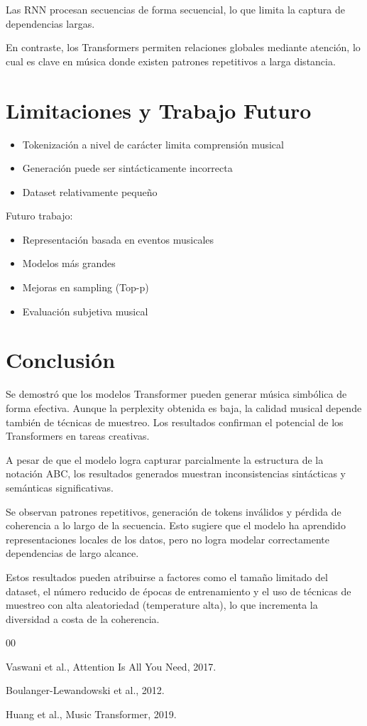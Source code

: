 \documentclass[conference]{IEEEtran}
\begin{document}
Las RNN procesan secuencias de forma secuencial, lo que limita la captura de dependencias largas.

En contraste, los Transformers permiten relaciones globales mediante atención, lo cual es clave en música donde existen patrones repetitivos a larga distancia.

\section{Limitaciones y Trabajo Futuro}

\begin{itemize}
\item Tokenización a nivel de carácter limita comprensión musical
\item Generación puede ser sintácticamente incorrecta
\item Dataset relativamente pequeño
\end{itemize}

Futuro trabajo:

\begin{itemize}
\item Representación basada en eventos musicales
\item Modelos más grandes
\item Mejoras en sampling (Top-p)
\item Evaluación subjetiva musical
\end{itemize}

\section{Conclusión}

Se demostró que los modelos Transformer pueden generar música simbólica de forma efectiva. Aunque la perplexity obtenida es baja, la calidad musical depende también de técnicas de muestreo. Los resultados confirman el potencial de los Transformers en tareas creativas.

A pesar de que el modelo logra capturar parcialmente la estructura de la notación ABC, los resultados generados muestran inconsistencias sintácticas y semánticas significativas.

Se observan patrones repetitivos, generación de tokens inválidos y pérdida de coherencia a lo largo de la secuencia. Esto sugiere que el modelo ha aprendido representaciones locales de los datos, pero no logra modelar correctamente dependencias de largo alcance.

Estos resultados pueden atribuirse a factores como el tamaño limitado del dataset, el número reducido de épocas de entrenamiento y el uso de técnicas de muestreo con alta aleatoriedad (temperature alta), lo que incrementa la diversidad a costa de la coherencia.



\begin{thebibliography}{00}

Vaswani et al., Attention Is All You Need, 2017.

Boulanger-Lewandowski et al., 2012.

Huang et al., Music Transformer, 2019.

\end{thebibliography}
\end{document}
